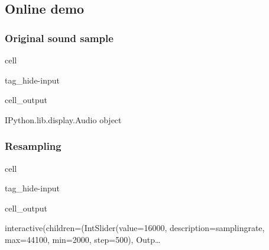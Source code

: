 \documentclass[letterpaper,10pt,english]{jupyterBook}
\begin{document}
\subsection{On\sphinxhyphen{}line demo}
\label{\detokenize{Representations/Waveform:on-line-demo}}

\subsubsection{Original sound sample}
\label{\detokenize{Representations/Waveform:original-sound-sample}}
\begin{sphinxuseclass}{cell}
\begin{sphinxuseclass}{tag_hide-input}\begin{sphinxVerbatimOutput}

\begin{sphinxuseclass}{cell_output}
\noindent{}

\begin{sphinxVerbatim}[commandchars=\\\{\}]
\PYGZlt{}IPython.lib.display.Audio object\PYGZgt{}
\end{sphinxVerbatim}

\end{sphinxuseclass}\end{sphinxVerbatimOutput}

\end{sphinxuseclass}
\end{sphinxuseclass}

\subsubsection{Resampling}
\label{\detokenize{Representations/Waveform:resampling}}
\begin{sphinxuseclass}{cell}
\begin{sphinxuseclass}{tag_hide-input}\begin{sphinxVerbatimOutput}

\begin{sphinxuseclass}{cell_output}
\begin{sphinxVerbatim}[commandchars=\\\{\}]
interactive(children=(IntSlider(value=16000, description=\PYGZsq{}sampling\PYGZus{}rate\PYGZsq{}, max=44100, min=2000, step=500), Outp…
\end{sphinxVerbatim}

\end{sphinxuseclass}\end{sphinxVerbatimOutput}

\end{sphinxuseclass}
\end{sphinxuseclass}
\end{document}
